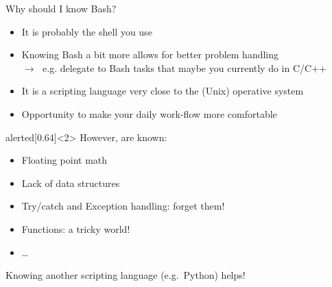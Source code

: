 \begin{frame}{Why should I know Bash?}%
    \vspace{-3mm}
    \begin{itemize}
        \item It is probably the shell you use
        \item Knowing Bash a bit more allows for better problem handling \\
              $\to\;$ e.g. delegate to Bash tasks that maybe you currently do in C/C++
        \item It is a scripting language very close to the (Unix) operative system
        \item Opportunity to make your daily work-flow more comfortable
    \end{itemize}
    \begin{varblock}{alerted}[0.64\textwidth]{}<2>
        However,  are known:\hfill
        \begin{itemize}
            \item Floating point math
            \item Lack of data structures
            \item Try/catch and Exception handling: forget them!
            \item Functions: a tricky world!
            \item \ldots
        \end{itemize}
        Knowing another scripting language (e.g.\ Python) helps!
    \end{varblock}
\end{frame}
